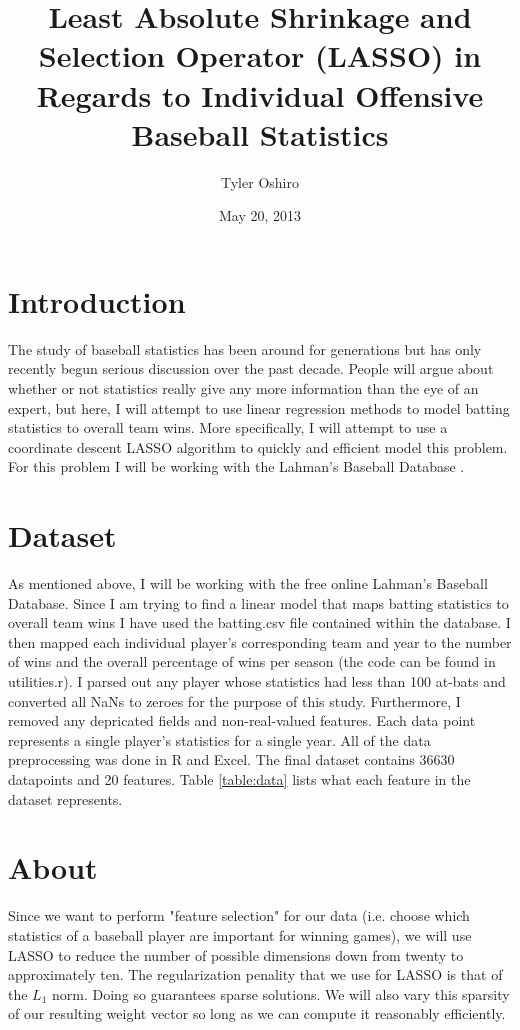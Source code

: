\documentclass{article}
\title{Least Absolute Shrinkage and Selection Operator (LASSO) in Regards to Individual Offensive Baseball Statistics}
\author{Tyler Oshiro}
\date{May 20, 2013}
\begin{document}
\maketitle
\tableofcontents
\newpage
\section{Introduction}
\label{Introduction}
The study of baseball statistics has been around for generations but has only recently begun serious discussion over the past decade. People will argue about whether or not statistics really give any more information than the eye of an expert, but here, I will attempt to use linear regression methods to model batting statistics to overall team wins. More specifically, I will attempt to use a coordinate descent LASSO algorithm to quickly and efficient model this problem. For this problem I will be working with the Lahman's Baseball Database \cite{lahman}.
\section{Dataset}
\label{Dataset}
As mentioned above, I will be working with the free online Lahman's Baseball Database. Since I am trying to find a linear model that maps batting statistics to overall team wins I have used the batting.csv file contained within the database. I then mapped each individual player's corresponding team and year to the number of wins and the overall percentage of wins per season (the code can be found in utilities.r). I parsed out any player whose statistics had less than 100 at-bats and converted all NaNs to zeroes for the purpose of this study. Furthermore, I removed any depricated fields and non-real-valued features. Each data point represents a single player's statistics for a single year. All of the data preprocessing was done in R and Excel. The final dataset contains 36630 datapoints and 20 features. Table \ref{table:data} lists what each feature in the dataset represents.
\section{About}
\label{About}
Since we want to perform "feature selection" for our data (i.e. choose which statistics of a baseball player are important for winning games), we will use LASSO to reduce the number of possible dimensions down from twenty to approximately ten. The regularization penality that we use for LASSO is that of the ${L_1}$ norm. Doing so guarantees sparse solutions. We will also vary this sparsity of our resulting weight vector so long as we can compute it reasonably efficiently.
\end{document}
